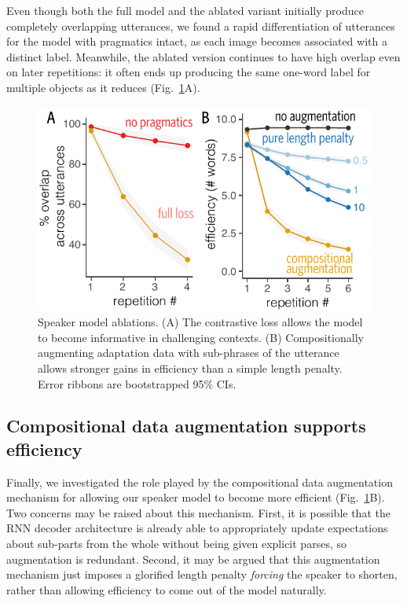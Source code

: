 \documentclass[11pt,a4paper]{article}
\begin{document}
Even though both the full model and the ablated variant initially produce completely overlapping utterances, we found a rapid differentiation of utterances for the model with pragmatics intact, as each image becomes associated with a distinct label.
Meanwhile, the ablated version continues to have high overlap even on later repetitions: it often ends up producing the same one-word label for multiple objects as it reduces (Fig.\ \ref{fig:speakerablation}A).

 \begin{figure}[b!]
\centering
\includegraphics[scale=0.7]{../figures/lossComparisonResults.pdf}
\vspace{-2em}
\caption{Speaker model ablations. (A) The contrastive loss allows the model to become informative in challenging contexts. (B) Compositionally augmenting adaptation data with sub-phrases of the utterance allows stronger gains in efficiency than a simple length penalty. Error ribbons are bootstrapped 95\% CIs.}
\vspace{-.5em}
\label{fig:speakerablation}
\end{figure}

\subsection*{Compositional data augmentation supports efficiency}
%
Finally, we investigated the role played by the compositional data augmentation mechanism for allowing our speaker model to become more efficient (Fig.\ \ref{fig:speakerablation}B).
Two concerns may be raised about this mechanism.
First, it is possible that the RNN decoder architecture is already able to appropriately update expectations about sub-parts from the whole without being given explicit parses, so augmentation is redundant. 
Second, it may be argued that this augmentation mechanism just imposes a glorified length penalty \emph{forcing} the speaker to shorten, rather than allowing efficiency to come out of the model naturally.
\end{document}
